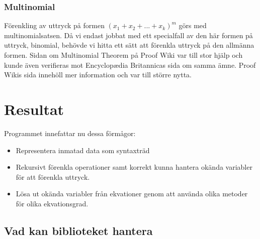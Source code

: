 \documentclass[12pt,a4paper]{article}
\begin{document}
\subsubsection{Multinomial}
Förenkling av uttryck på formen \((x_{1}+x_{2}+...+x_{k})^{m}\) görs med multinomialsatsen. Då vi endast jobbat med ett specialfall av den här formen på uttryck, binomial, behövde vi hitta ett sätt att förenkla uttryck på den allmänna formen. Sidan om Multinomial Theorem på Proof Wiki var till stor hjälp och kunde även verifieras mot Encyclopædia Britannicas sida om samma ämne. Proof Wikis sida innehöll mer information och var till större nytta.

\section{Resultat}
Programmet innefattar nu dessa förmågor:
\begin{itemize}
	\item Representera inmatad data som syntaxträd
	\item Rekursivt förenkla operationer samt korrekt kunna hantera okända variabler för att förenkla uttryck.
	\item Lösa ut okända variabler från ekvationer genom att använda olika metoder för olika ekvationsgrad.
\end{itemize}

\subsection{Vad kan biblioteket hantera}
\end{document}
